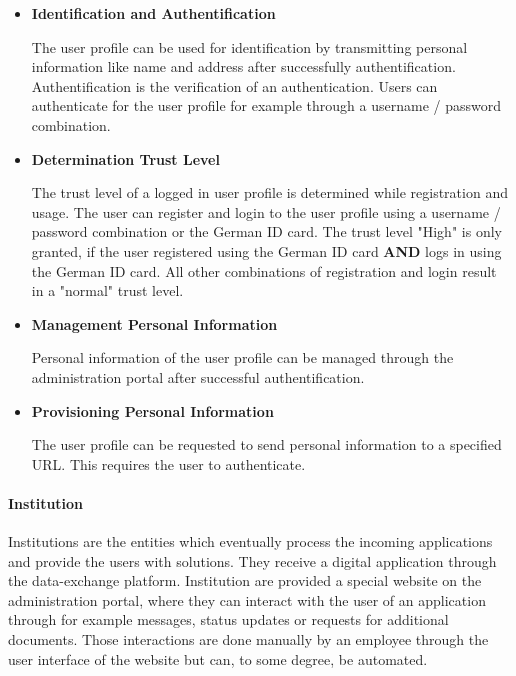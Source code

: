 \documentclass[
     12pt,         %
     a4paper,      %
     BCOR=10mm,version=first,     %
     DIV=14,version=first,        %
     ]{scrreprt}
\begin{document}
\begin{itemize}
    \item \textbf{Identification and Authentification} \cite{dNRW:Anbindungsleitfaden}
    
    The user profile can be used for identification by transmitting personal information like name and address after successfully authentification. Authentification is the verification of an authentication. Users can authenticate for the user profile for example through a username / password combination.
    
    \item \textbf{Determination Trust Level} \cite{dNRW:Anbindungsleitfaden}
    
    The trust level of a logged in user profile is determined while registration and usage. The user can register and login to the user profile using a username / password combination or the German ID card. The trust level "High" is only granted, if the user registered using the German ID card \textbf{AND} logs in using the German ID card. All other combinations of registration and login result in a "normal" trust level.
    
    \item \textbf{Management Personal Information} \cite{dNRW:Anbindungsleitfaden} 
    
    Personal information of the user profile can be managed through the administration portal after successful authentification.
    
    \item \textbf{Provisioning Personal Information} \cite{dNRW:Anbindungsleitfaden} \cite{dNRW:Schnittstellen}

    The user profile can be requested to send personal information to a specified URL. This requires the user to authenticate.
    
\end{itemize}

\paragraph{Institution}
Institutions are the entities which eventually process the incoming applications and provide the users with solutions. They receive a digital application through the data-exchange platform. Institution are provided a special website on the administration portal, where they can interact with the user of an application through for example messages, status updates or requests for additional documents. Those interactions are done manually by an employee through the user interface of the website but can, to some degree, be automated.
\end{document}
